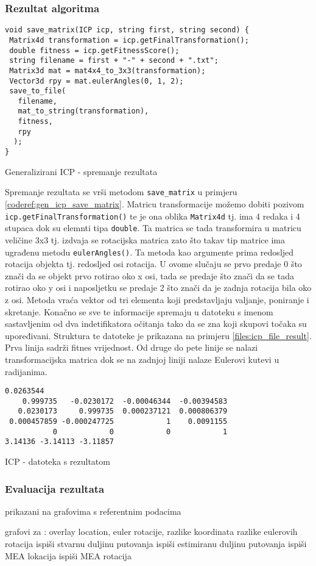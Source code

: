 \subsubsection{Rezultat algoritma}

\begin{listing}[H]
  \begin{verbatim}
void save_matrix(ICP icp, string first, string second) {
 Matrix4d transformation = icp.getFinalTransformation();
 double fitness = icp.getFitnessScore();
 string filename = first + "-" + second + ".txt";
 Matrix3d mat = mat4x4_to_3x3(transformation);
 Vector3d rpy = mat.eulerAngles(0, 1, 2);
 save_to_file(
   filename,
   mat_to_string(transformation),
   fitness,
   rpy
  );
}
  \end{verbatim}
  \caption{Generalizirani ICP - spremanje rezultata}
  \label{coderef:gen_icp_save_matrix}
\end{listing}

Spremanje rezultata se vrši metodom \texttt{save_matrix} u primjeru \ref{coderef:gen_icp_save_matrix}. Matricu transformacije možemo dobiti pozivom \texttt{icp.getFinalTransformation()} te je ona oblika \texttt{Matrix4d} tj. ima 4 redaka i 4 stupaca dok su elemnti tipa \texttt{double}. Ta matrica se tada transformira u matricu veličine 3x3 tj. izdvaja se rotacijska matrica zato što takav tip matrice ima ugrađenu metodu \texttt{eulerAngles()}. Ta metoda kao argumente prima redosljed rotacija objekta tj. redosljed osi rotacija. U ovome slučaju se prvo predaje 0 što znači da se objekt prvo rotirao oko x osi, tada se predaje što znači da se tada rotirao oko y osi i naposljetku se predaje 2 što znači da je zadnja rotacija bila oko z osi. Metoda vraća vektor od tri elementa koji predstavljaju valjanje, poniranje i skretanje. Konačno se sve te informacije spremaju u datoteku s imenom sastavljenim od dva indetifikatora očitanja tako da se zna koji skupovi točaka su upoređivani. Struktura te datoteke je prikazana na primjeru  \ref{files:icp_file_result}. Prva linija sadrži fitnes vrijednost. Od druge do pete linije se nalazi transformacijska matrica dok se na zadnjoj liniji nalaze Eulerovi kutevi u radijanima.
\begin{listing}[H]
  \begin{verbatim}
0.0263544
    0.999735   -0.0230172  -0.00046344  -0.00394583
   0.0230173     0.999735  0.000237121  0.000806379
 0.000457859 -0.000247725            1    0.0091155
           0            0            0            1
3.14136 -3.14113 -3.11857
  \end{verbatim}
  \caption{ICP - datoteka s rezultatom}
  \label{files:icp_file_result}
\end{listing}

\pagebreak
\subsubsection{Evaluacija rezultata}
prikazani na grafovima s referentnim podacima

grafovi za :
  overlay location,
  euler rotacije,
  razlike koordinata
  razlike eulerovih rotacija
ispiši stvarnu duljinu putovanja
ispiši estimiranu duljinu putovanja
ispiši MEA lokacija
ispiši MEA rotacija
\pagebreak